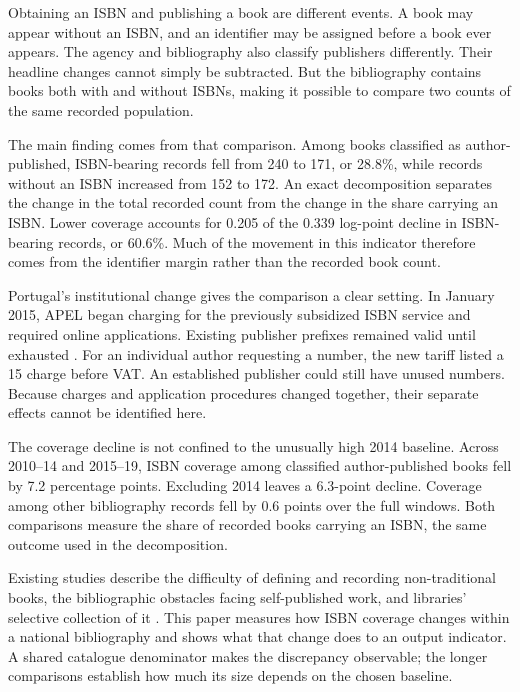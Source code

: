 \documentclass[11pt]{article}
\begin{document}
Obtaining an ISBN and publishing a book are different events. A book may appear without an ISBN, and an identifier may be assigned before a book ever appears. The agency and bibliography also classify publishers differently. Their headline changes cannot simply be subtracted. But the bibliography contains books both with and without ISBNs, making it possible to compare two counts of the same recorded population.

The main finding comes from that comparison. Among books classified as author-published, ISBN-bearing records fell from 240 to 171, or 28.8\%, while records without an ISBN increased from 152 to 172. An exact decomposition separates the change in the total recorded count from the change in the share carrying an ISBN. Lower coverage accounts for 0.205 of the 0.339 log-point decline in ISBN-bearing records, or 60.6\%. Much of the movement in this indicator therefore comes from the identifier margin rather than the recorded book count.

Portugal's institutional change gives the comparison a clear setting. In January 2015, APEL began charging for the previously subsidized ISBN service and required online applications. Existing publisher prefixes remained valid until exhausted \citep{apel2014,apel2015}. For an individual author requesting a number, the new tariff listed a \texteuro{}15 charge before VAT. An established publisher could still have unused numbers. Because charges and application procedures changed together, their separate effects cannot be identified here.

The coverage decline is not confined to the unusually high 2014 baseline. Across 2010--14 and 2015--19, ISBN coverage among classified author-published books fell by 7.2 percentage points. Excluding 2014 leaves a 6.3-point decline. Coverage among other bibliography records fell by 0.6 points over the full windows. Both comparisons measure the share of recorded books carrying an ISBN, the same outcome used in the decomposition.

Existing studies describe the difficulty of defining and recording non-traditional books, the bibliographic obstacles facing self-published work, and libraries' selective collection of it \citep{bradley2011,holley2014,dilevko2006}. This paper measures how ISBN coverage changes within a national bibliography and shows what that change does to an output indicator. A shared catalogue denominator makes the discrepancy observable; the longer comparisons establish how much its size depends on the chosen baseline.
\end{document}
